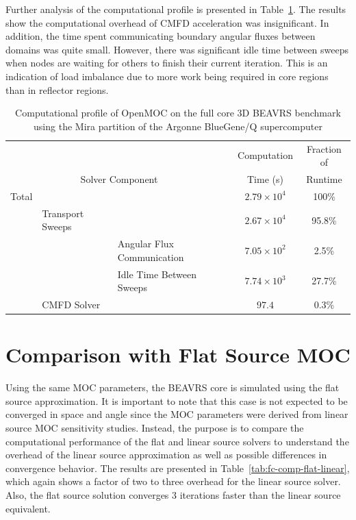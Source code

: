Further analysis of the computational profile is presented in Table~\ref{tab:full-core-comp-prof}. The results show the computational overhead of CMFD acceleration was insignificant. In addition, the time spent communicating boundary angular fluxes between domains was quite small. However, there was significant idle time between sweeps when nodes are waiting for others to finish their current iteration. This is an indication of load imbalance due to more work being required in core regions than in reflector regions.

\begin{table}[ht]
	\centering
	\caption{Computational profile of OpenMOC on the full core 3D BEAVRS benchmark using the Mira partition of the Argonne BlueGene/Q supercomputer}
	\medskip
	\begin{tabular}{lll|c|c}
		\hline
		& & & Computation & Fraction of \\
		\multicolumn{3}{c|}{Solver Component} & Time (s) & Runtime\\
		\hline
		Total & & & $2.79 \times 10^4$ & 100\% \\
		& Transport Sweeps & & $2.67 \times 10^4$ & 95.8\% \\
		& & Angular Flux Communication & $7.05 \times 10^2$ & 2.5\% \\
		& & Idle Time Between Sweeps & $7.74 \times 10^3$ & 27.7\% \\
		& CMFD Solver & & $97.4$ & 0.3\% \\		
		\hline
	\end{tabular}
	\label{tab:full-core-comp-prof}
\end{table}

\newpage

\section{Comparison with Flat Source MOC}
\label{sec:fc-flat-source}

Using the same \ac{MOC} parameters, the BEAVRS core is simulated using the flat source approximation. It is important to note that this case is not expected to be converged in space and angle since the \ac{MOC} parameters were derived from linear source \ac{MOC} sensitivity studies. Instead, the purpose is to compare the computational performance of the flat and linear source solvers to understand the overhead of the linear source approximation as well as possible differences in convergence behavior. The results are presented in Table~\ref{tab:fc-comp-flat-linear}, which again shows a factor of two to three overhead for the linear source solver. Also, the flat source solution converges 3 iterations faster than the linear source equivalent. 


